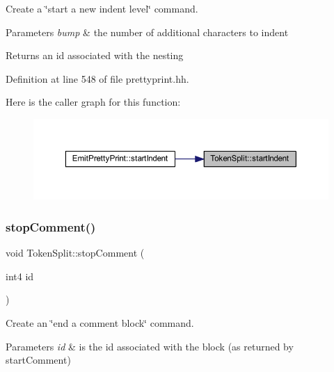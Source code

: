 Create a \char`\"{}start a new indent level\char`\"{} command. 


\begin{DoxyParams}{Parameters}
{\em bump} & the number of additional characters to indent \\
\hline
\end{DoxyParams}
\begin{DoxyReturn}{Returns}
an id associated with the nesting 
\end{DoxyReturn}


Definition at line 548 of file prettyprint.\+hh.

Here is the caller graph for this function\+:
\nopagebreak
\begin{figure}[H]
\begin{center}
\leavevmode
\includegraphics[width=350pt]{class_token_split_abc86a21025a728d2dbe050fe22b9570b_icgraph}
\end{center}
\end{figure}
\mbox{\label{class_token_split_ac93137757a2cc85219ef8cd5fb994a6c}} 
\subsubsection{\texorpdfstring{stopComment()}{stopComment()}}
{\footnotesize\ttfamily void Token\+Split\+::stop\+Comment (\begin{DoxyParamCaption}\item[{int4}]{id }\end{DoxyParamCaption})\hspace{0.3cm}{\ttfamily [inline]}}



Create an \char`\"{}end a comment block\char`\"{} command. 


\begin{DoxyParams}{Parameters}
{\em id} & is the id associated with the block (as returned by start\+Comment) \\
\hline
\end{DoxyParams}


